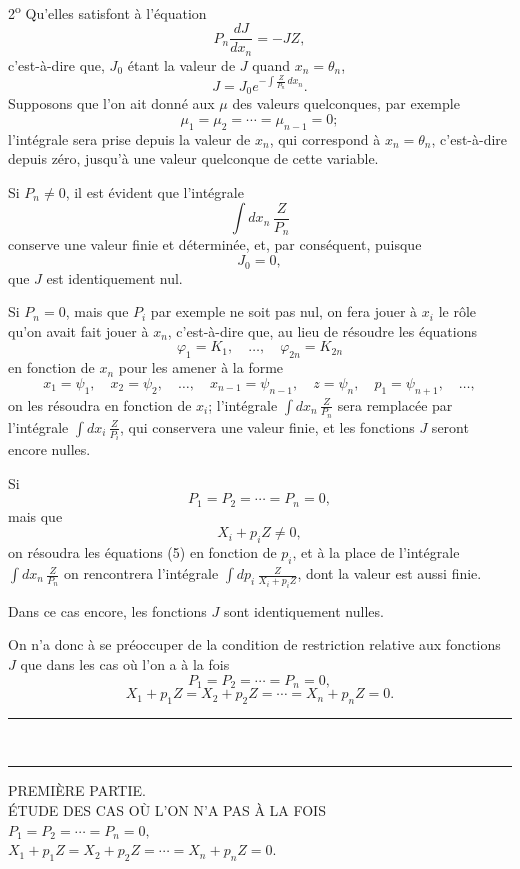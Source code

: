 \documentclass[11pt]{article}
\newcommand{\ornament}{\begin{center}\rule{2.5em}{0.4pt}\,\raisebox{0.1ex}{\tiny$\bullet\bullet\bullet$}\,\rule{2.5em}{0.4pt}\end{center}}
\begin{document}
2\textsuperscript{o} Qu'elles satisfont à l'équation
\[
P_n\frac{dJ}{dx_n}=-JZ,
\]
c'est-à-dire que, $J_0$ étant la valeur de $J$ quand $x_n=\theta_n$,
\[
J=J_0e^{-\int \frac{Z}{P_n}\,dx_n}.
\]
Supposons que l'on ait donné aux $\mu$ des valeurs quelconques, par exemple
\[
\mu_1=\mu_2=\cdots=\mu_{n-1}=0;
\]
l'intégrale sera prise depuis la valeur de $x_n$, qui correspond à $x_n=\theta_n$, c'est-à-dire depuis zéro, jusqu'à une valeur quelconque de cette variable.

Si $P_n\ne0$, il est évident que l'intégrale
\[
\int dx_n\,\frac{Z}{P_n}
\]
conserve une valeur finie et déterminée, et, par conséquent, puisque
\[
J_0=0,
\]
que $J$ est identiquement nul.

Si $P_n=0$, mais que $P_i$ par exemple ne soit pas nul, on fera jouer à $x_i$ le rôle qu'on avait fait jouer à $x_n$, c'est-à-dire que, au lieu de résoudre les équations
\begin{equation*}\tag{5}
\varphi_1=K_1,
\quad \ldots,
\quad \varphi_{2n}=K_{2n}
\end{equation*}
en fonction de $x_n$ pour les amener à la forme
\begin{equation*}\tag{6}
x_1=\psi_1,
\quad x_2=\psi_2,
\quad \ldots,
\quad x_{n-1}=\psi_{n-1},
\quad z=\psi_n,
\quad p_1=\psi_{n+1},
\quad \ldots,
\end{equation*}
on les résoudra en fonction de $x_i$; l'intégrale $\displaystyle\int dx_n\,\frac{Z}{P_n}$ sera remplacée par l'intégrale $\displaystyle\int dx_i\,\frac{Z}{P_i}$, qui conservera une valeur finie, et les fonctions $J$ seront encore nulles.

Si
\[
P_1=P_2=\cdots=P_n=0,
\]
mais que
\[
X_i+p_iZ\ne0,
\]
on résoudra les équations (5) en fonction de $p_i$, et à la place de l'intégrale $\displaystyle\int dx_n\,\frac{Z}{P_n}$ on rencontrera l'intégrale $\displaystyle\int dp_i\,\frac{Z}{X_i+p_iZ}$, dont la valeur est aussi finie.

Dans ce cas encore, les fonctions $J$ sont identiquement nulles.

On n'a donc à se préoccuper de la condition de restriction relative aux fonctions $J$ que dans les cas où l'on a à la fois
\[
P_1=P_2=\cdots=P_n=0,
\]
\[
X_1+p_1Z=X_2+p_2Z=\cdots=X_n+p_nZ=0.
\]

\ornament

\begin{center}
{\Large PREMIÈRE PARTIE.}\\[0.8em]
{\small ÉTUDE DES CAS OÙ L’ON N’A PAS À LA FOIS}\\[0.6em]
$P_1=P_2=\cdots=P_n=0,$\\[0.35em]
$X_1+p_1Z=X_2+p_2Z=\cdots=X_n+p_nZ=0.$
\end{center}
\end{document}
